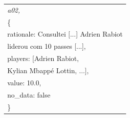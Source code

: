 \providecommand{\jq}{\char34{}}
\providecommand{\ji}{\hspace*{1.2em}}
\vspace{2mm}
\noindent\begin{minipage}{\columnwidth}
\ttfamily\scriptsize\frenchspacing
\renewcommand{\arraystretch}{1.0}
\begin{tabular}{@{}l@{}}
\textrm{\itshape a02, \armGraphTools{}} \\
\{ \\
\ji\jq rationale\jq: \jq Consultei [...] Adrien Rabiot \\
\ji\ji liderou com 10 passes [...]\jq, \\
\ji\jq players\jq: [\jq Adrien Rabiot\jq, \\
\ji\ji \jq Kylian Mbappé Lottin\jq, ...], \\
\ji\jq value\jq: 10.0, \\
\ji\jq no\_data\jq: false \\
\}
\end{tabular}
\label{fig:json}
\end{minipage}\par\smallskip
